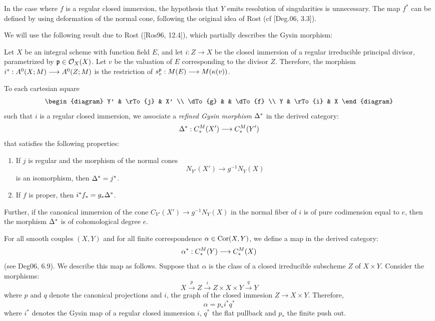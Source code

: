 In the case where $f$ is a regular closed immersion, the 
hypothesis that $Y$ emits resolution of singularities is 
unnecessary. The map $f^*$ can be defined by using deformation
of the normal cone, following the original idea of Rost (cf 
[Deg.06, 3.3]).

We will use the following result due to Rost ([Ros96, 12.4]),
which partially describes the Gysin morphism:

\begin{prop}\label{prop_2_3}
Let $X$ be an integral scheme with function field $E$, and let $i: 
Z \to X$ be the closed immersion of a regular irreducible 
principal divisor, parametrized by $\mathfrak{p} \in \mathcal{O}_X(X)$. Let 
$v$ be the valuation of $E$ corresponding to the divisor $Z$. 
Therefore, the morphism $i^*: A^0(X; M) \longrightarrow A^0(Z; 
M)$ is the restriction of $s_{v}^{\mathfrak{p}}: M(E) \longrightarrow 
M(\kappa(v))$.
\end{prop}

To each cartesian square
\[
\begin{diagram}
Y'      & \rTo{j} & X'      \\
\dTo{g} &         & \dTo{f} \\
Y       & \rTo{i} & X
\end{diagram}
\]
such that $i$ is a regular closed immersion, we associate a 
\emph{refined Gysin morphism} $\Delta^*$ in the derived 
category:
\[
\Delta^*: C_*^{M}(X') \longrightarrow C_*^{M}(Y')
\]
that satisfies the following properties:
\begin{enumerate}
\item If $j$ is regular and the morphism of the normal cones
\[
N_{Y'}(X') \to g^{-1}N_Y(X)
\] 
is an isomorphism, then $\Delta^* = j^*$.

\item If $f$ is proper, then $i^*f_* = g_*\Delta^*$.
\end{enumerate}

Further, if the canonical immersion of the cone $C_{Y'}(X') \to
g^{-1}N_Y(X)$ in the normal fiber of $i$ is of pure codimension
equal to $e$, then the morphism $\Delta^*$ is of cohomological
degree $e$.

For all smooth couples $(X, Y)$ and for all finite correspondence
$\alpha \in \mathrm{Cor}(X, Y)$, we define a map in the derived category:
\[
\alpha^* : C_*^{M}(Y) \longrightarrow C_*^{M}(X)
\]
(see Deg06, 6.9). We describe this map as follows. Suppose that 
$\alpha$ is the class of a closed irreducible subscheme $Z$ of $X 
\times Y$. Consider the morphisms:
\[
X \stackrel{p}{\rightarrow} Z \stackrel{i}{\to} Z \times X \times Y
\stackrel{q}{\to} Y
\]
where $p$ and $q$ denote the canonical projections and $i$, the
graph of the closed immesion $Z \to X \times Y$. Therefore,
\begin{equation}\label{eq_2_5_a}
\alpha = p_* i^*q^*
\end{equation}
where $i^*$ denotes the Gysin map of a regular closed immersion 
$i$, $q^*$ the flat pullback and $p_*$ the finite push out.

